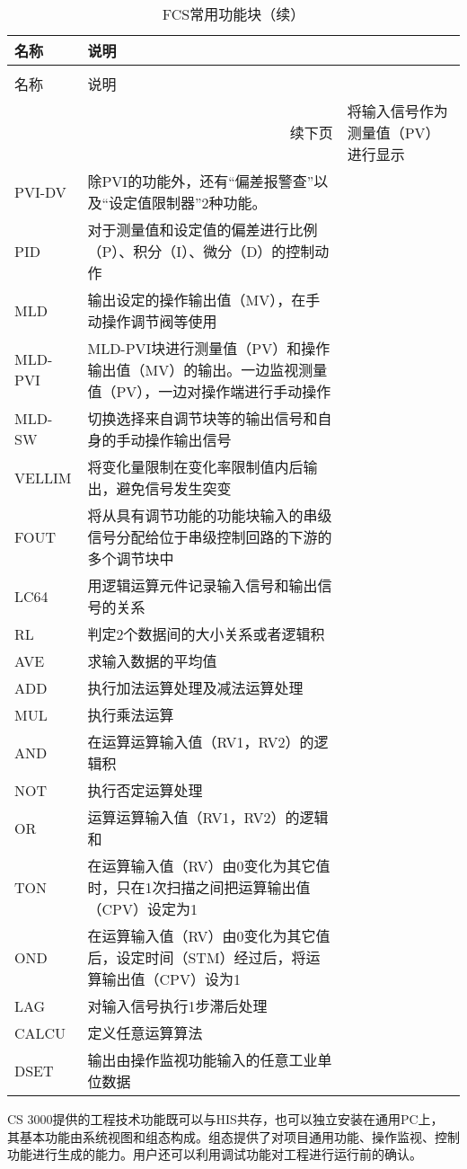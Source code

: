 \begingroup
\renewcommand*{\arraystretch}{1.67}
\begin{small}
\begin{longtable}[!h]{l|p{11cm}}
\caption[FCS常用控制块]{FCS常用控制块} \label{tab:fcs_blocks}\\

\toprule[0.5pt]
\hline
名称  & 说明 \\
\midrule
\endfirsthead
\caption[FCS常用控制块（续）]{FCS常用功能块（续）} \\
\toprule[0.5pt]
\hline
名称  & 说明 \\
\midrule
\endhead
\hline
\multicolumn{2}{r}{\small 续下页}
\endfoot
\hline
\bottomrule[0.5pt]
\endlastfoot

PVI &   将输入信号作为测量值（PV）进行显示\\
PVI-DV  &   除PVI的功能外，还有“偏差报警查”以及“设定值限制器”2种功能。\\
PID &   对于测量值和设定值的偏差进行比例（P）、积分（I）、微分（D）的控制动作\\
MLD&输出设定的操作输出值（MV），在手动操作调节阀等使用\\
MLD-PVI&MLD-PVI块进行测量值（PV）和操作输出值（MV）的输出。一边监视测量值（PV），一边对操作端进行手动操作\\
MLD-SW&切换选择来自调节块等的输出信号和自身的手动操作输出信号\\
VELLIM&将变化量限制在变化率限制值内后输出，避免信号发生突变\\
FOUT&将从具有调节功能的功能块输入的串级信号分配给位于串级控制回路的下游的多个调节块中\\
LC64&用逻辑运算元件记录输入信号和输出信号的关系\\
RL&判定2个数据间的大小关系或者逻辑积\\
AVE&求输入数据的平均值\\
ADD&执行加法运算处理及减法运算处理\\
MUL&执行乘法运算\\
AND&在运算运算输入值（RV1，RV2）的逻辑积\\
NOT&执行否定运算处理\\
OR&运算运算输入值（RV1，RV2）的逻辑和\\
TON&在运算输入值（RV）由0变化为其它值时，只在1次扫描之间把运算输出值（CPV）设定为1\\
OND&在运算输入值（RV）由0变化为其它值后，设定时间（STM）经过后，将运算输出值（CPV）设为1\\
LAG&对输入信号执行1步滞后处理\\
CALCU&定义任意运算算法\\
DSET&输出由操作监视功能输入的任意工业单位数据\\
\end{longtable}
\end{small}
\endgroup
CS 3000提供的工程技术功能既可以与HIS共存，也可以独立安装在通用PC上， 其基本功能由系统视图和组态构成。组态提供了对项目通用功能、操作监视、控制功能进行生成的能力。用户还可以利用调试功能对工程进行运行前的确认。


